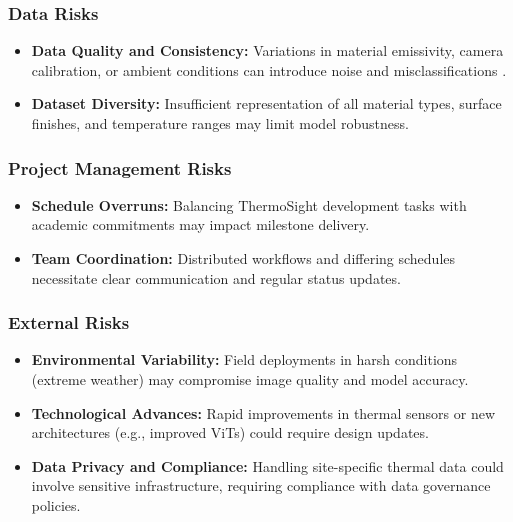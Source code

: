 \subsubsection{Data Risks}
\begin{itemize}[leftmargin=*]
    \item \textbf{Data Quality and Consistency:} Variations in material emissivity, camera calibration, or ambient conditions can introduce noise and misclassifications \cite{Li2023}.
    \item \textbf{Dataset Diversity:} Insufficient representation of all material types, surface finishes, and temperature ranges may limit model robustness.
\end{itemize}

\subsubsection{Project Management Risks}
\begin{itemize}[leftmargin=*]
    \item \textbf{Schedule Overruns:} Balancing ThermoSight development tasks with academic commitments may impact milestone delivery.
    \item \textbf{Team Coordination:} Distributed workflows and differing schedules necessitate clear communication and regular status updates.
\end{itemize}

\subsubsection{External Risks}
\begin{itemize}[leftmargin=*]
    \item \textbf{Environmental Variability:} Field deployments in harsh conditions (extreme weather) may compromise image quality and model accuracy.
    \item \textbf{Technological Advances:} Rapid improvements in thermal sensors or new architectures (e.g., improved ViTs) could require design updates.
    \item \textbf{Data Privacy and Compliance:} Handling site-specific thermal data could involve sensitive infrastructure, requiring compliance with data governance policies.
\end{itemize}


